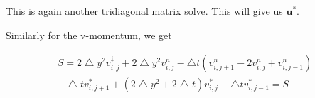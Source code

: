 \documentclass[12pt]{article}
\begin{document}
This is again another tridiagonal matrix solve. This will give us $\mathbf{u}^*$.

Similarly for the v-momentum, we get

\begin{align}
S = 2\bigtriangleup y^2 v^\ddagger_{i,j} + 2\bigtriangleup y^2 v^n_{i,j} - \bigtriangleup t(v^n_{i,j+1} - 2v^n_{i,j} + v^n_{i,j-1}) \\
-\bigtriangleup t v^*_{i,j+1} + (2\bigtriangleup y^2 + 2\bigtriangleup t)v^*_{i,j} - \bigtriangleup t v^*_{i,j-1} = S
\end{align}
\end{document}
